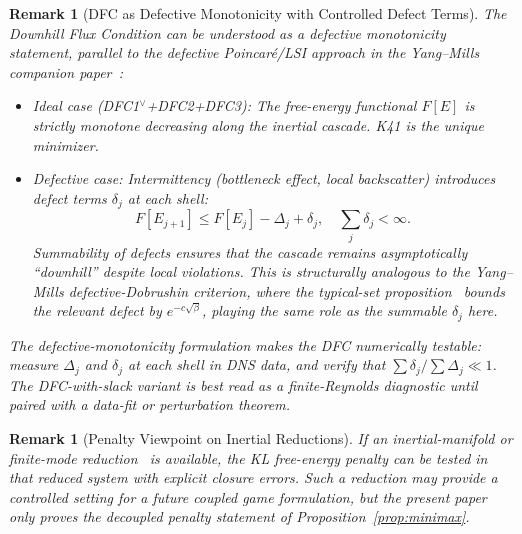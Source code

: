 \documentclass[12pt,a4paper]{article}
\theoremstyle{breakdef}
\theoremstyle{breakplain}
\theoremstyle{breakdef}
\newtheorem{remark}[definition]{Remark}
\begin{document}
\begin{remark}[DFC as Defective Monotonicity with Controlled Defect Terms]
\label{rem:dfc-defective-monotonicity}
The Downhill Flux Condition can be understood as a \emph{defective monotonicity} statement, parallel to the defective Poincaré/LSI approach in the Yang--Mills companion paper~\cite{Geiger2026-YM}:
\begin{itemize}
\item \emph{Ideal case (DFC1$^\vee$+DFC2+DFC3):} The free-energy functional $F[E]$ is strictly monotone decreasing along the inertial cascade. K41 is the unique minimizer.
\item \emph{Defective case:} Intermittency (bottleneck effect, local backscatter) introduces defect terms $\delta_j$ at each shell:
\[
F[E_{j+1}] \leq F[E_j] - \Delta_j + \delta_j, \quad \sum_j \delta_j < \infty.
\]
Summability of defects ensures that the cascade remains asymptotically ``downhill'' despite local violations. This is structurally analogous to the Yang--Mills defective-Dobrushin criterion, where the typical-set proposition~\cite{Geiger2026-YM} bounds the relevant defect by $e^{-c\sqrt{\beta}}$, playing the same role as the summable $\delta_j$ here.
\end{itemize}
The defective-monotonicity formulation makes the DFC \emph{numerically testable}: measure $\Delta_j$ and $\delta_j$ at each shell in DNS data, and verify that $\sum \delta_j / \sum \Delta_j \ll 1$. The DFC-with-slack variant is best read as a finite-Reynolds diagnostic until paired with a data-fit or perturbation theorem.
\end{remark}

\begin{remark}[Penalty Viewpoint on Inertial Reductions]
\label{rem:minimax-inertial}
If an inertial-manifold or finite-mode reduction~\cite{FoiasSellTemam88}
is available, the KL
free-energy penalty can be tested in that reduced system with explicit
closure errors. Such a reduction may provide a controlled setting for a
future coupled game formulation, but the present paper only proves the
decoupled penalty statement of Proposition~\ref{prop:minimax}.
\end{remark}



\end{document}
